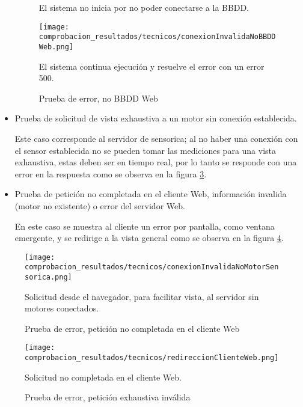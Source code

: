 \begin{itemize}
\begin{figure}[H]
            El sistema no inicia por no poder conectarse a la BBDD.
            \label{img:NoBBDDSensorica}
        \end{figure}

        \begin{figure}[H]
            \centering
            \caption{Prueba de error, no BBDD Web}
            \texttt{[image: comprobacion\_resultados/tecnicos/conexionInvalidaNoBBDDWeb.png]}

            El sistema continua ejecución y resuelve el error con un error 500.
            \label{img:NoBBDDWeb}
        \end{figure}
    \item Prueba de solicitud de vista exhaustiva a un motor sin conexión
        establecida.

        Este caso corresponde al servidor de sensorica; al no haber una conexión
        con el sensor establecida no se pueden tomar las mediciones para una vista
        exhaustiva, estas deben ser en tiempo real, por lo tanto se responde
        con una error en la respuesta como se observa en la figura \ref{img:ErrorExhaustiva}.

    \item Prueba de petición no completada en el cliente Web,
        información invalida (motor no existente) o error del servidor Web.

        En este caso se muestra al cliente un error por pantalla, como ventana
        emergente, y se redirige a la vista general como se observa en la
        figura \ref{img:SolicitudNoCompletada}.
\end{itemize}

        \begin{figure}[H]
            \centering
            \caption{Prueba de error, petición no completada en el cliente Web}
            \texttt{[image: comprobacion\_resultados/tecnicos/conexionInvalidaNoMotorSensorica.png]}

            Solicitud  desde el navegador, para facilitar vista, al servidor
            sin motores conectados.
            \label{img:ErrorExhaustiva}
        \end{figure}

        \begin{figure}[H]
            \centering
            \caption{Prueba de error, petición exhaustiva inválida}
            \texttt{[image: comprobacion\_resultados/tecnicos/redireccionClienteWeb.png]}

            Solicitud no completada en el cliente Web. \label{img:SolicitudNoCompletada}
        \end{figure}

